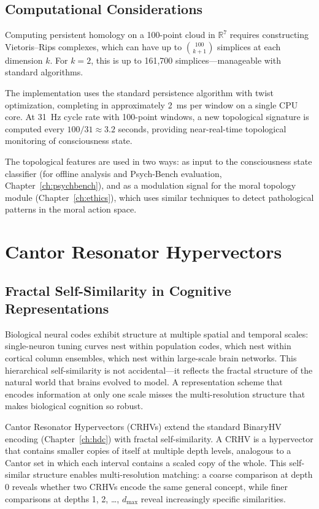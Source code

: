 \documentclass[12pt]{book}
\newcommand{\R}{\mathbb{R}}
\begin{document}
\section{Computational Considerations}

Computing persistent homology on a 100-point cloud in $\R^7$ requires constructing Vietoris--Rips complexes, which can have up to $\binom{100}{k+1}$ simplices at each dimension $k$. For $k = 2$, this is up to 161,700 simplices---manageable with standard algorithms.

The implementation uses the standard persistence algorithm with twist optimization, completing in approximately 2~ms per window on a single CPU core. At 31~Hz cycle rate with 100-point windows, a new topological signature is computed every $100/31 \approx 3.2$ seconds, providing near-real-time topological monitoring of consciousness state.

The topological features are used in two ways: as input to the consciousness state classifier (for offline analysis and Psych-Bench evaluation, Chapter~\ref{ch:psychbench}), and as a modulation signal for the moral topology module (Chapter~\ref{ch:ethics}), which uses similar techniques to detect pathological patterns in the moral action space.


\chapter{Cantor Resonator Hypervectors}
\label{ch:cantor}

\section{Fractal Self-Similarity in Cognitive Representations}

Biological neural codes exhibit structure at multiple spatial and temporal scales: single-neuron tuning curves nest within population codes, which nest within cortical column ensembles, which nest within large-scale brain networks. This hierarchical self-similarity is not accidental---it reflects the fractal structure of the natural world that brains evolved to model. A representation scheme that encodes information at only one scale misses the multi-resolution structure that makes biological cognition so robust.

Cantor Resonator Hypervectors (CRHVs) extend the standard BinaryHV encoding (Chapter~\ref{ch:hdc}) with fractal self-similarity. A CRHV is a hypervector that contains smaller copies of itself at multiple depth levels, analogous to a Cantor set in which each interval contains a scaled copy of the whole. This self-similar structure enables multi-resolution matching: a coarse comparison at depth 0 reveals whether two CRHVs encode the same general concept, while finer comparisons at depths 1, 2, \ldots, $d_{\max}$ reveal increasingly specific similarities.
\end{document}
